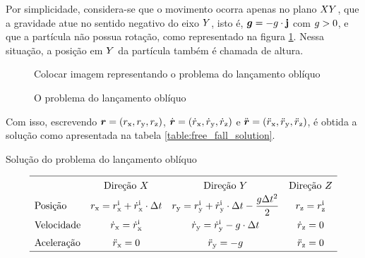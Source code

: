 Por simplicidade, considera-se que o movimento ocorra apenas no plano \(XY\), que a gravidade atue no sentido negativo do eixo \(Y\), isto é, \(\bm{g} = -g\cdot\mathbf{j}\) com \(g>0\), e que a partícula não possua rotação, como representado na figura \ref{fig:free_fall}. Nessa situação, a posição em \(Y\) da partícula também é chamada de altura.

\begin{figure}[h]
	\caption{O problema do lançamento oblíquo}
	\begin{center}
		\alert{Colocar imagem representando o problema do lançamento oblíquo}
	\end{center}
	\label{fig:free_fall}
\end{figure}

Com isso, escrevendo \(\position = \explicitVectorCoordinates{\positionScalar}\), \(\velocity = \explicitVectorCoordinates{\velocityScalar}\) e \(\acceleration = \explicitVectorCoordinates{\accelerationScalar}\), é obtida a solução como apresentada na tabela \ref{table:free_fall_solution}.

\begin{table}[h]
	\caption{Solução do problema do lançamento oblíquo}
	\label{table:free_fall_solution}

	\begin{equation*}
		\def\arraystretch{1.5}
		\begin{array}{lccc}
	\hline
		& \text{Direção } \xAxis 
		& \text{Direção } \yAxis 
		& \text{Direção } \zAxis
		\\
	\text{Posição} 
		& \positionx = \initial{\positionx} + \initial{\velocityx}\cdot \Dt
		& \positiony = \initial{\positiony} + \initial{\velocityy}\cdot \Dt - \dfrac{\gravityScalar\Dt^2}{2}
		& \positionz = \initial{\positionz} \\
	\text{Velocidade} 
		& \velocityx = \initial{\velocityx}
		& \velocityy = \initial{\velocityy} - \gravityScalar\cdot \Dt
		& \velocityz = 0 \\
	\text{Aceleração} 
		& \accelerationx = 0
		& \accelerationy = - \gravityScalar
		& \accelerationz = 0 \\
	\hline	
		\end{array}
	\end{equation*}
\end{table}

